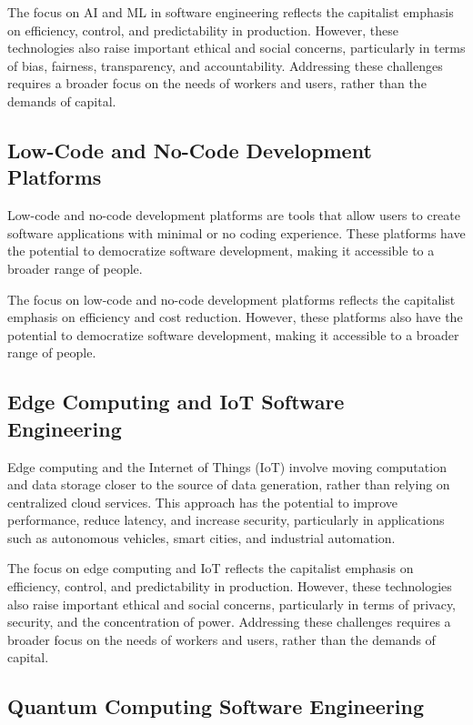 \begin{refsection}
\begin{multicols}{2}
{The focus on AI and ML in software engineering reflects the capitalist emphasis on efficiency, control, and predictability in production. However, these technologies also raise important ethical and social concerns, particularly in terms of bias, fairness, transparency, and accountability. Addressing these challenges requires a broader focus on the needs of workers and users, rather than the demands of capital.

\subsection{Low-Code and No-Code Development Platforms}

Low-code and no-code development platforms are tools that allow users to create software applications with minimal or no coding experience. These platforms have the potential to democratize software development, making it accessible to a broader range of people.

The focus on low-code and no-code development platforms reflects the capitalist emphasis on efficiency and cost reduction. However, these platforms also have the potential to democratize software development, making it accessible to a broader range of people.

\subsection{Edge Computing and IoT Software Engineering}

Edge computing and the Internet of Things (IoT) involve moving computation and data storage closer to the source of data generation, rather than relying on centralized cloud services. This approach has the potential to improve performance, reduce latency, and increase security, particularly in applications such as autonomous vehicles, smart cities, and industrial automation.

The focus on edge computing and IoT reflects the capitalist emphasis on efficiency, control, and predictability in production. However, these technologies also raise important ethical and social concerns, particularly in terms of privacy, security, and the concentration of power. Addressing these challenges requires a broader focus on the needs of workers and users, rather than the demands of capital.

\subsection{Quantum Computing Software Engineering}

}
\end{multicols}
\end{refsection}
